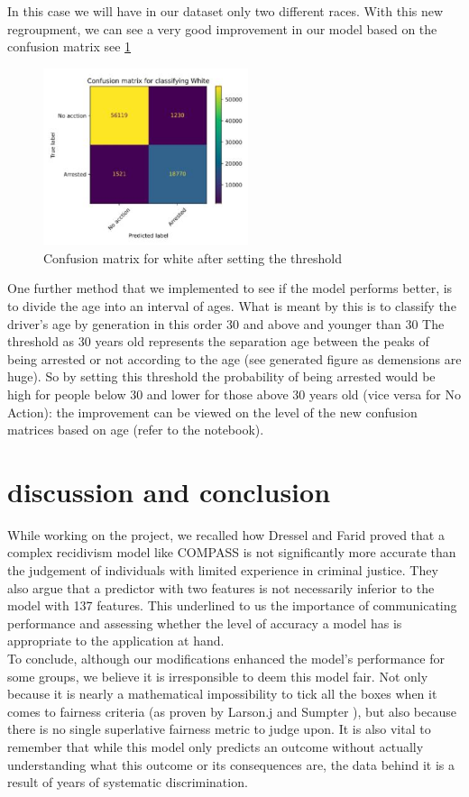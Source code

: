 \documentclass[doctype=studienarbeit,lang=english,BCOR=15mm,biblatex]{ldvbook}
\begin{document}
In this case we will have in our dataset only two different races. With this new regroupment, we can see a very good improvement in our model based on the confusion matrix see \ref{fig:whitethresh}
\begin{figure}
    \centering
    \includegraphics[width=6cm]{whiteafter.JPG}
    \caption{Confusion matrix for white after setting the threshold}
    \label{fig:whitethresh}
\end{figure} 
\begin{samepage}
One further method that we implemented to see if the model performs better, is to divide the age into an interval of ages. What is meant by this is to classify the driver's age by generation in this order 30 and above and younger than 30
The threshold as 30 years old represents the separation age between the peaks of being arrested or not according to the age (see generated figure as demensions are huge). So by setting this threshold the probability of being arrested would be high for people below 30 and lower for those above 30 years old (vice versa for No Action): the improvement can be viewed on the level of the new confusion matrices based on age (refer to the notebook). 
\let\clearpage\relax
\chapter{discussion and conclusion}
While working on the project, we recalled how Dressel and Farid \cite{pmid29376122} proved that a complex recidivism model like COMPASS is not significantly more accurate than the judgement of individuals with limited experience in criminal justice. They also argue that a predictor with two features is not necessarily inferior to the model with 137 features. This underlined to us the importance of communicating performance and assessing whether the level of accuracy a model has is appropriate to the application at hand.\\
To conclude, although our modifications enhanced the model’s performance for some groups, we believe it is irresponsible to deem this model fair. Not only because it is nearly a mathematical impossibility to tick all the boxes when it comes to fairness criteria (as proven by Larson.j  \cite{compass} and Sumpter \cite{ethics}), but also because there is no single superlative fairness metric to judge upon. It is also vital to remember that while this model only predicts an outcome without actually understanding what this outcome or its consequences are, the data behind it is a result of years of systematic discrimination. 
\end{samepage}



\printbibliography{}
\end{document}
